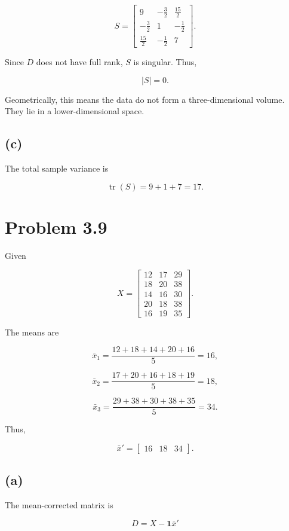 \documentclass[12pt]{article}
\begin{document}
$$
\boxed{
S=
\begin{bmatrix}
9&-\frac32&\frac{15}{2}\\
-\frac32&1&-\frac12\\
\frac{15}{2}&-\frac12&7
\end{bmatrix}}.
$$

Since $D$ does not have full rank, $S$ is singular. Thus,

$$
\boxed{|S|=0}.
$$

Geometrically, this means the data do not form a three-dimensional volume. They lie in a lower-dimensional space.

\subsection*{(c)}

The total sample variance is

$$
\operatorname{tr}(S)
=
9+1+7
=
\boxed{17}.
$$

\newpage

\section*{Problem 3.9}

Given

$$
X=
\begin{bmatrix}
12&17&29\\
18&20&38\\
14&16&30\\
20&18&38\\
16&19&35
\end{bmatrix}.
$$

The means are

$$
\bar{x}_1
=
\frac{12+18+14+20+16}{5}
=16,
$$

$$
\bar{x}_2
=
\frac{17+20+16+18+19}{5}
=18,
$$

$$
\bar{x}_3
=
\frac{29+38+30+38+35}{5}
=34.
$$

Thus,

$$
\bar{x}'=
\begin{bmatrix}
16&18&34
\end{bmatrix}.
$$

\subsection*{(a)}

The mean-corrected matrix is

$$
D=X-\mathbf{1}\bar{x}'
$$
\end{document}
